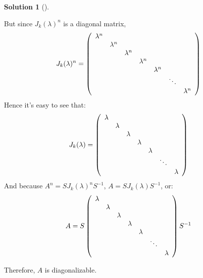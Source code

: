\documentclass[numbers=enddot,12pt,final,onecolumn,notitlepage]{scrartcl}
\newcounter{sol}
\theoremstyle{definition}
\newtheorem{solu}[sol]{Solution}
\newenvironment{solution}[1][]
{\begin{solu}[#1]\begin{leftbar}}
        {\end{leftbar}\end{solu}}
\begin{document}
\begin{solution}
	But since $J_k(\lambda)^n$ is a diagonal matrix,
	\[
		J_k(\lambda)^n = \left(
		\begin{array}
				[c]{ccccccc}%
				\lambda^{n} &             &             &             &             &        &             \\
				            & \lambda^{n} &             &             &             &        &             \\
				            &             & \lambda^{n} &             &             &        &             \\
				            &             &             & \lambda^{n} &             &        &             \\
				            &             &             &             & \lambda^{n} &        &             \\
				            &             &             &             &             & \ddots &             \\
				            &             &             &             &             &        & \lambda^{n}
			\end{array}
		\right)
	\]
	Hence it's easy to see that:
	\[
		J_k(\lambda) = \left(
		\begin{array}
				[c]{ccccccc}%
				\lambda &         &         &         &         &        &         \\
				        & \lambda &         &         &         &        &         \\
				        &         & \lambda &         &         &        &         \\
				        &         &         & \lambda &         &        &         \\
				        &         &         &         & \lambda &        &         \\
				        &         &         &         &         & \ddots &         \\
				        &         &         &         &         &        & \lambda
			\end{array}
		\right)
	\]
	And because $A^n = SJ_k(\lambda)^nS^{-1}$, $A = SJ_k(\lambda)S^{-1}$, or:
	\[
		A = S
		\left(
		\begin{array}
				[c]{ccccccc}%
				\lambda &         &         &         &         &        &         \\
				        & \lambda &         &         &         &        &         \\
				        &         & \lambda &         &         &        &         \\
				        &         &         & \lambda &         &        &         \\
				        &         &         &         & \lambda &        &         \\
				        &         &         &         &         & \ddots &         \\
				        &         &         &         &         &        & \lambda
			\end{array}
		\right) S^{-1}
	\]

	Therefore, $A$ is diagonalizable.

\end{solution}
\end{document}
